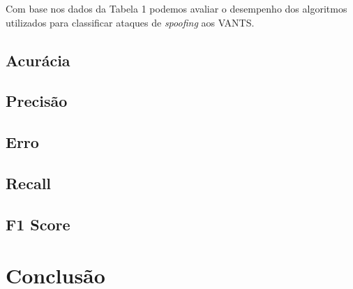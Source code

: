\documentclass[12pt]{article}
\begin{document}

Com base nos dados da Tabela 1 podemos avaliar o desempenho dos algoritmos utilizados 
para classificar ataques de \textit{spoofing} aos VANTS.
\subsection{Acurácia}
\subsection{Precisão}
\subsection{Erro}
\subsection{Recall}
\subsection{F1 Score}


\section{Conclusão}
\printbibliography
\end{document}
